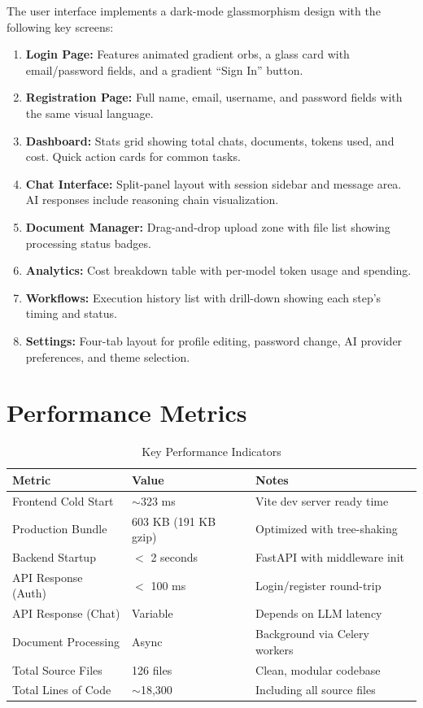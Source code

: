 \documentclass[12pt, a4paper]{report}
\begin{document}
The user interface implements a dark-mode glassmorphism design with the following key screens:

\begin{enumerate}
    \item \textbf{Login Page:} Features animated gradient orbs, a glass card with email/password fields, and a gradient ``Sign In'' button.
    \item \textbf{Registration Page:} Full name, email, username, and password fields with the same visual language.
    \item \textbf{Dashboard:} Stats grid showing total chats, documents, tokens used, and cost. Quick action cards for common tasks.
    \item \textbf{Chat Interface:} Split-panel layout with session sidebar and message area. AI responses include reasoning chain visualization.
    \item \textbf{Document Manager:} Drag-and-drop upload zone with file list showing processing status badges.
    \item \textbf{Analytics:} Cost breakdown table with per-model token usage and spending.
    \item \textbf{Workflows:} Execution history list with drill-down showing each step's timing and status.
    \item \textbf{Settings:} Four-tab layout for profile editing, password change, AI provider preferences, and theme selection.
\end{enumerate}

\section{Performance Metrics}

\begin{table}[H]
\centering
\caption{Key Performance Indicators}
\label{tab:performance}
\begin{tabularx}{\textwidth}{l|l|X}
\toprule
\textbf{Metric} & \textbf{Value} & \textbf{Notes} \\
\midrule
Frontend Cold Start        & $\sim$323 ms    & Vite dev server ready time \\
Production Bundle          & 603 KB (191 KB gzip) & Optimized with tree-shaking \\
Backend Startup            & $<$ 2 seconds   & FastAPI with middleware init \\
API Response (Auth)        & $<$ 100 ms      & Login/register round-trip \\
API Response (Chat)        & Variable        & Depends on LLM latency \\
Document Processing        & Async           & Background via Celery workers \\
Total Source Files          & 126 files       & Clean, modular codebase \\
Total Lines of Code        & $\sim$18,300    & Including all source files \\
\bottomrule
\end{tabularx}
\end{table}
\end{document}
